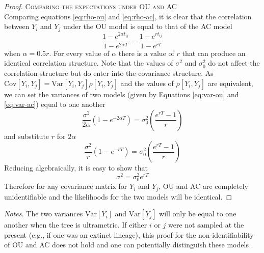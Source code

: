 \documentclass[12pt,twoside]{article}
\newcommand{\Var}{\mathrm{Var}}
\newcommand{\Cov}{\mathrm{Cov}}
\begin{document}
\begin{proof}
\par{\textsc{Comparing the expectations under OU and AC}}\\
Comparing equations \ref{eq:rho-ou} and \ref{eq:rho-ac}, it is clear that the correlation between $Y_i$ and $Y_j$ under the OU model is equal to that of the AC model
\begin{equation}
\frac{1-e^{2\alpha t_{ij}}}
{1-e^{2\alpha T}} = \frac{1-e^{r t_{ij}}}{1-e^{r T}}
\end{equation}
when $\alpha = 0.5 r$. For every value of $\alpha$ there is a value of $r$ that can produce an identical correlation structure. Note that the values of $\sigma^2$ and $\sigma^2_0$ do not affect the correlation structure but do enter into the covariance structure. As $\Cov[Y_i, Y_j] = \Var[Y_i, Y_j]\rho[Y_i, Y_j]$ and the values of $\rho[Y_i, Y_j]$ are equivalent, we can set the variances of two models (given by Equations \ref{eq:var-ou} and \ref{eq:var-ac}) equal to one another
\begin{equation}\label{eq:var}
\frac{\sigma^2}{2\alpha}(1 - e^{-2\alpha T}) = \sigma^2_0 \left(\frac{e^{rT} - 1}{r} \right)
\end{equation}
and substitute $r$ for $2\alpha$
\[\frac{\sigma^2}{r}(1 - e^{-r T}) = \sigma^2_0 \left(\frac{e^{r T} - 1}{r} \right)\]
Reducing algebraically, it is easy to show that
\begin{equation}
\sigma^2 = \sigma^2_0 e^{rT}
\end{equation}
Therefore for any covariance matrix for $Y_i$ and $Y_j$, OU and AC are completely unidentifiable and the likelihoods for the two models will be identical.

\end{proof}

\noindent \emph{Notes.} The two variances $\Var[Y_i]$ and $\Var[Y_j]$ will only be equal to one another when the tree is ultrametric. If either $i$ or $j$ were not sampled at the present (e.g., if one was an extinct lineage), this proof for the non-identifiability of OU and AC does not hold and one can potentially distinguish these models \citep{SlaterFossil}.


\renewcommand\thefigure{S.\arabic{figure}}
\renewcommand\thetable{S.\arabic{table}}
\clearpage
\listoffigures
\end{document}
